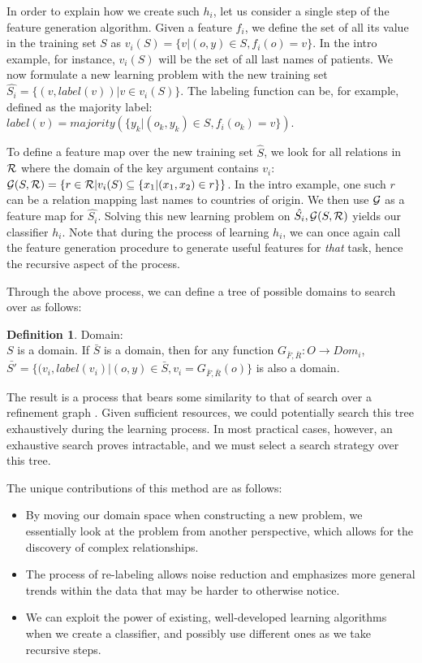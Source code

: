 \documentclass[12pt, a4paper]{article}
\theoremstyle{definition}
\newtheorem{defn}{Definition}[section]
\begin{document}
In order to explain how we create such $h_{i}$, let us consider a single step of the feature generation algorithm.
Given a feature $f_{i}$, we define the set of all its value in the training set $S$ as $v_i(S) = \{v | (o,y) \in S, f_{i}(o)=v\}$. In the intro example, for instance, $v_i(S)$ will be the set of all last names of patients.
We now formulate a new learning problem with the new training set
$\hat{S_i} = \{ (v, label(v)) | v \in v_i(S) \}$.
The labeling function can be, for example, defined as
the majority label: $label(v)=majority(\{y_k| \left(o_k,y_k \right) \in S, f_{i}(o_k)=v\})$.

To define a feature map over the new training set $\hat{S}$, we look for all relations in $\cal R$ where the domain of the key argument contains $v_i$:
${\cal G}(S,{\cal R}) = \left\{ r \in {\cal R} | v_i(S) \subseteq \{x_1 | (x_1,x_2) \in r\}\right\}$. In the intro example, one such $r$ can be a relation mapping last names to countries of origin. We then use ${\cal G}$ as a feature map for $\hat{S_i}$.
Solving this new learning problem on $\hat{S_i}, {\cal G}(S,{\cal R})$ yields our classifier $h_{i}$.
Note that during the process of learning $h_{i}$, we can once again call the feature generation procedure to generate useful features for \emph{that} task, hence the recursive aspect of the process.

Through the above process, we can define a tree of possible domains to search over as follows:
\begin{defn} Domain:\\%
$S$ is a domain.
If $\bar{S}$ is a domain, then for any function $G_{\bar{F},\bar{R}}: O\rightarrow Dom_i$, $\bar{S'}=\{(v_i,label(v_i)|(o,y)\in \bar{S}, v_i=G_{\bar{F},\bar{R}}(o)\}$ is also a domain.
\end{defn}
The result is a process that bears some similarity to that of search over a refinement graph \citep{dvzeroski2001introduction,van1998completeness}.
Given sufficient resources, we could potentially search this tree exhaustively during the learning process. In most practical cases, however, an exhaustive search proves intractable, and we must select a search strategy over this tree.

The unique contributions of this method are as follows:
\begin{itemize}
    \item By moving our domain space when constructing a new problem, we essentially look at the problem from another perspective, which allows for the discovery of complex relationships.
    \item The process of re-labeling allows noise reduction and emphasizes more general trends within the data that may be harder to otherwise notice.
    \item We can exploit the power of existing, well-developed learning algorithms when we create a classifier, and possibly use different ones as we take recursive steps.
\end{itemize}
\end{document}
